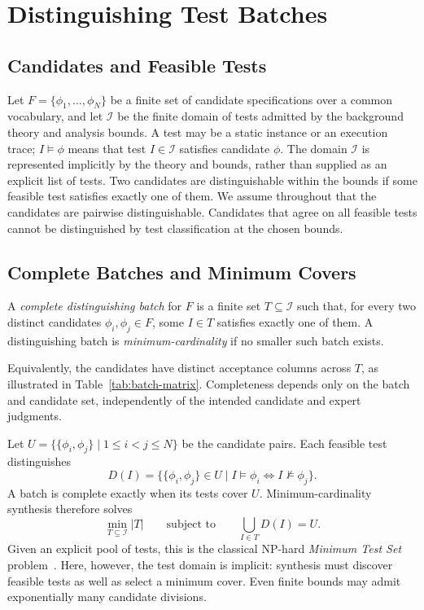 \documentclass[runningheads]{llncs}
\begin{document}
\section{Distinguishing Test Batches}
\label{sec:problem}

\subsection{Candidates and Feasible Tests}

Let $F=\{\phi_1,\ldots,\phi_N\}$ be a finite set of candidate specifications
over a common vocabulary, and let $\mathcal I$ be the finite domain of tests
admitted by the background theory and analysis bounds. A test may be a static
instance or an execution trace; $I\models\phi$ means that test $I \in \mathcal I$ satisfies
candidate $\phi$. The domain $\mathcal I$ is represented implicitly by the
theory and bounds, rather than supplied as an explicit list of tests.
Two candidates are distinguishable within the bounds if some feasible test
satisfies exactly one of them. We assume throughout that the candidates are
pairwise distinguishable. Candidates that agree on all feasible tests cannot
be distinguished by test classification at the chosen bounds.

\subsection{Complete Batches and Minimum Covers}

\begin{definition}
A \emph{complete distinguishing batch} for $F$ is a finite set
$T\subseteq\mathcal I$ such that, for every two distinct candidates
$\phi_i,\phi_j\in F$, some $I\in T$ satisfies exactly one of them. A
distinguishing batch is \emph{minimum-cardinality} if no smaller such batch
exists.
\end{definition}

Equivalently, the candidates have distinct acceptance columns across $T$, as
illustrated in Table~\ref{tab:batch-matrix}. Completeness depends only on the batch and candidate set, independently of
the intended candidate and expert judgments.

Let $U=\{\{\phi_i,\phi_j\}\mid 1\leq i<j\leq N\}$ be the candidate pairs.
Each feasible test distinguishes
\[
  D(I)=\{\{\phi_i,\phi_j\}\in U\mid
          I\models\phi_i \Longleftrightarrow I\not\models\phi_j\}.
\]
A batch is complete exactly when its tests cover $U$. Minimum-cardinality
synthesis therefore solves
\[
  \min_{T\subseteq\mathcal I}|T|
  \qquad\text{subject to}\qquad
  \bigcup_{I\in T}D(I)=U.
\]
Given an explicit pool of tests, this is the classical NP-hard
\emph{Minimum Test Set} problem~\cite{GareyJohnson,moret1985minimizing}. Here, however,
the test domain is implicit: synthesis must discover feasible tests as well
as select a minimum cover. Even finite bounds may admit exponentially many candidate divisions.
\end{document}

